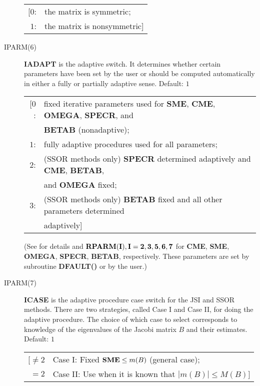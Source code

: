 \begin{description}
                 \begin{tabular}{rl} 
                 [$0$: & the matrix is symmetric; \\
                  $1$: & the matrix is nonsymmetric]
                 \end{tabular} 
  
 \item[IPARM(6)] {\bf IADAPT} is the adaptive switch.  It determines 
                 whether certain parameters have been set by the user or 
                 should be computed automatically in either a fully 
                 or partially adaptive sense. Default: $1$
 
                 \begin{tabular}{rl}
                 [$0$: & fixed iterative parameters used for {\bf SME}, 
                         {\bf CME}, {\bf OMEGA}, {\bf SPECR}, and \\
                       & {\bf BETAB} (nonadaptive); \\
                  $1$: & fully adaptive procedures used for all parameters; \\
                  $2$: & (SSOR methods only) {\bf SPECR} determined 
                         adaptively and {\bf CME}, {\bf BETAB},\\
                       & and {\bf OMEGA} fixed; \\
                  $3$: & (SSOR methods only) {\bf BETAB} fixed and all other
                         parameters determined \\
                       & adaptively]
                 \end{tabular} 

                 \noindent
                 (See \cite{1,2} for details and ${\bf RPARM(I), I=2,3,5,6,7}$ 
                 for {\bf CME}, {\bf SME}, {\bf OMEGA}, {\bf SPECR}, 
                 {\bf BETAB}, respectively.  These parameters are set
                 by subroutine {\bf DFAULT()} or by the user.)
 
 \item[IPARM(7)] {\bf ICASE} is the adaptive procedure case switch for the
                 JSI and SSOR methods.  There are two strategies, called 
                 Case I and Case II, for doing the adaptive procedure.
                 The choice of which case to select corresponds to knowledge 
                 of the eigenvalues of the Jacobi matrix $B$ and their 
                 estimates.  Default: $1$
 
                 \begin{tabular}{rl}
                 [$\neq 2$ & Case I: Fixed ${\bf SME} \leq m(B)$ 
                                      (general case); \\
                  $=2$     & Case II: Use when it is known that
                                  $|m(B)| \leq M(B)]$ 
                 \end{tabular}


\end{description}
